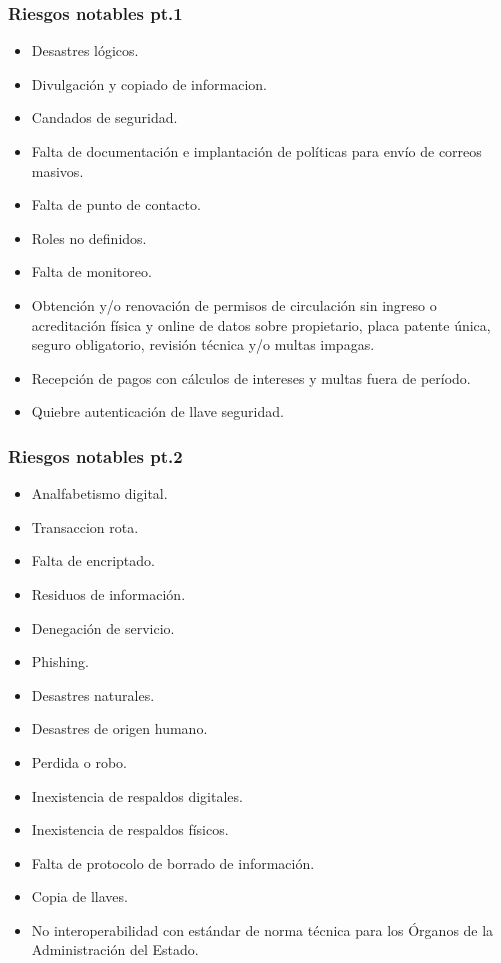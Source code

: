 \documentclass{beamer}
\begin{document}
\begin{frame}[c,fragile]
	\frametitle{Riesgos notables pt.1}
	\begin{itemize}
		\begin{itemize}
			\item Desastres lógicos.
			\item Divulgación y copiado de informacion.
			\item Candados de seguridad.
			\item Falta de documentación e implantación de políticas para envío de correos masivos.
			\item Falta de punto de contacto.
			\item Roles no definidos.
			\item Falta de monitoreo.
			\item Obtención y/o renovación de permisos de circulación sin ingreso o acreditación física y online de datos sobre propietario, placa patente única, seguro obligatorio, revisión técnica y/o multas impagas.
			\item Recepción de pagos con cálculos de intereses y multas fuera de período.
			\item Quiebre autenticación de llave seguridad.
		\end{itemize}
	\end{itemize}
\end{frame}

\begin{frame}[c,fragile]
	\frametitle{Riesgos notables pt.2}
	\begin{itemize}
		\begin{itemize}
			\item Analfabetismo digital.
			\item Transaccion rota.
			\item Falta de encriptado.
			\item Residuos de información.
			\item Denegación de servicio.
			\item Phishing.
			\item Desastres naturales.
			\item Desastres de origen humano.
			\item Perdida o robo.
			\item Inexistencia de respaldos digitales.
			\item Inexistencia de respaldos físicos.
			\item Falta de protocolo de borrado de información.
			\item Copia de llaves.
			\item No interoperabilidad con estándar de norma técnica para los Órganos de la Administración del Estado.
		\end{itemize}
	\end{itemize}
\end{frame}
\end{document}
